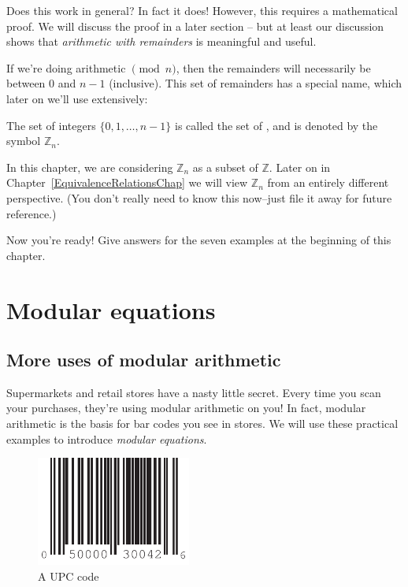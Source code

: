 Does this work in general? In fact it does! However, this requires a mathematical proof.  We will discuss the proof in a later section -- but at least our discussion shows that \emph{arithmetic with remainders} is meaningful and useful.

If we're doing arithmetic $\pmod{n}$, then the remainders will necessarily be between $0$ and $n-1$ (inclusive). This set of  remainders has a special name, which later on we'll use extensively:

\begin{defn}\label{integers_mod_n}
The set of integers $\{0,1,\ldots,n-1\}$ is called the set of , and is denoted by the symbol ${\mathbb Z}_n$.
\end{defn}

\begin{rem}
In this chapter, we are considering ${\mathbb Z}_n$ as a subset of $\mathbb{Z}$. Later on in Chapter~\ref{EquivalenceRelationsChap} we will view ${\mathbb Z}_n$ from an entirely different perspective. (You don't really need to know this now--just file it away for future reference.)
\end{rem}

\begin{exercise}{28}
Now you're ready! Give answers for the seven examples at the beginning of this chapter.
\end{exercise}

\section{Modular equations\quad
{}}\label{section:modular:ModularEquations}

\subsection{More uses of modular arithmetic  }
 
Supermarkets and retail stores have a nasty  little secret. Every time you scan your purchases, they're using modular arithmetic on you! In fact, modular arithmetic is the basis for  bar codes you see in stores. We will use these practical examples to introduce \emph{modular equations}. 

\begin{figure}
\begin{center}
\centerline {
\includegraphics[width=2in]{images/UPCcode.pdf}
}
\end{center}
\caption{A UPC code}
\label{groups_figure_3}
\end{figure}


